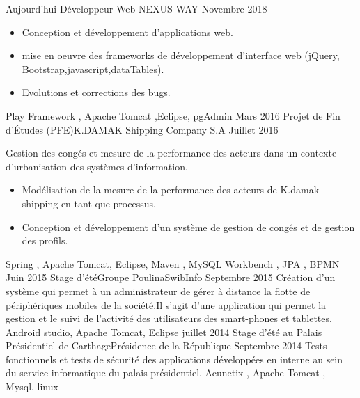 %
%
%
\begin{experiences}
  \experience
    {Aujourd'hui}   {Développeur Web }{NEXUS-WAY}{}
    {Novembre 2018} {
                      \begin{itemize}
                       \item Conception et développement d'applications web.
                       \item mise en oeuvre des frameworks de développement d'interface web (jQuery, Bootstrap,javascript,dataTables).
                       
                        \item Evolutions et corrections des bugs.                         
                      \end{itemize}
                    }
                    {Play Framework , Apache Tomcat ,Eclipse, pgAdmin}
  \emptySeparator
  \experience
    {Mars 2016} {Projet de Fin d’Études (PFE)}{K.DAMAK Shipping Company S.A}{}
    {Juillet 2016}    {
                   Gestion des congés et mesure de la performance des acteurs dans un contexte d’urbanisation des systèmes d’information.
                    \begin{itemize}
                       \item Modélisation de la mesure de la performance des acteurs de K.damak shipping en tant que processus.
                       \item Conception et développement d’un système de gestion de congés et de gestion des profils.                        
                      \end{itemize}
                    }
                    {Spring , Apache Tomcat, Eclipse, Maven , MySQL Workbench , JPA , BPMN }
  \emptySeparator
  \experience
    {Juin 2015}     {Stage d’été}{Groupe Poulina}{SwibInfo}
    {Septembre 2015}    {
                     Création d’un système qui permet à un administrateur de gérer à distance la flotte de périphériques mobiles de la société.Il s’agit d’une application qui permet la gestion et le suivi de l’activité des utilisateurs des smart-phones et tablettes.
                    }
                    { Android studio, Apache Tomcat, Eclipse}
  \emptySeparator
 \experience
    {juillet 2014}   {Stage d’été }{au Palais Présidentiel de Carthage}{Présidence de la République}
    {Septembre 2014} {
                      Tests fonctionnels et tests de sécurité des applications développées en interne au sein du service informatique du palais présidentiel.
                    }
                    {Acunetix , Apache Tomcat , Mysql, linux}
  \emptySeparator
 

\end{experiences}
